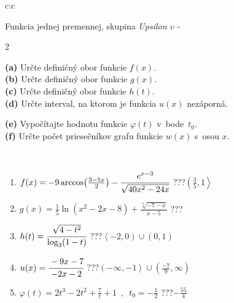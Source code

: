 \documentclass[10pt]{report}
\begin{document}
\begin{tabular}{c:c}
\begin{minipage}[c][104.5mm][t]{0.5\linewidth}
\begin{center}
\vspace{7mm}
{\huge Funkcia jednej premennej, skupina \textit{Upsilon $\upsilon$} -}\\[5mm]
\begin{minipage}{0.95\linewidth}
\begin{center}
{\small \begin{multicols}{2} \raggedright
\textbf{(a)} Určte definičný obor funkcie \(f(x)\). \\[1mm]
\textbf{(b)} Určte definičný obor funkcie \(g(x)\). \\[1mm]
\textbf{(c)} Určte definičný obor funkcie \(h(t)\). \\[1mm]
\textbf{(d)} Určte interval, na ktorom je funkcia \(u(x)\) nezáporná. \par \columnbreak
\textbf{(e)} Vypočítajte hodnotu funkcie \(\varphi(t)\) v~bode~\(t_0\). \\[1mm]
\textbf{(f)} Určte počet priesečníkov grafu funkcie \(w(x)\) s~osou \(x\). \\[1mm]
\end{multicols}
}
\end{center}
\end{minipage}
\\[4mm]
\begin{minipage}{0.79\linewidth}
\begin{center}
\begin{varwidth}{\linewidth}
\begin{enumerate}
\small
\item $f(x) = -9\arccos\!\left( \frac{3-5x}{2} \right) - \cfrac{e^{x-3}}{\sqrt{40x^2-24x}}$\quad \dotfill\; ???\;\dotfill \quad $\left(\frac{3}{5} , 1\right\rangle$
\item $g(x) = \frac{1}{5} \ln{\!(x^2-2x-8)}+\frac{\sqrt[3]{-7-x}}{x-5}$\quad \dotfill\; ???\;\dotfill {}
\item $h(t) = \cfrac{\sqrt{4-t^2}}{\log_3(1-t)}$\quad \dotfill\; ???\;\dotfill \quad $\left\langle-2 , 0\right)\cup\left(0 , 1\right)$
\item $u(x) = \cfrac{-9x-7}{-2x-2}$\quad \dotfill\; ???\;\dotfill \quad $\left(-\infty , -1\right\rangle\cup\left(\frac{-7}{9} , \infty\right)$
\item $\varphi(t) = 2t^3-2t^2+\frac{7}{t}+1 \enspace , \enspace t_0=-\frac{1}{2}$\quad \dotfill\; ???\;\dotfill \quad $-\frac{55}{4}$

\end{enumerate}
\end{varwidth}
\end{center}
\end{minipage}
\end{center}
\end{minipage}
\end{tabular}
\end{document}
